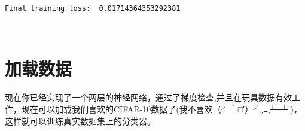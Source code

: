 \documentclass[11pt]{article}
\begin{document}
    \begin{Verbatim}[commandchars=\\\{\}]
Final training loss:  0.01714364353292381
    \end{Verbatim}

    \begin{center}
    \end{center}
    { \hspace*{\fill} \\}
    
    \hypertarget{ux52a0ux8f7dux6570ux636e}{%
\section{加载数据}\label{ux52a0ux8f7dux6570ux636e}}

现在你已经实现了一个两层的神经网络，通过了梯度检查,并且在玩具数据有效工作，现在可以加载我们喜欢的CIFAR-10数据了(我不喜欢（╯‵□′）╯︵┴─┴
)，这样就可以训练真实数据集上的分类器。
\end{document}
